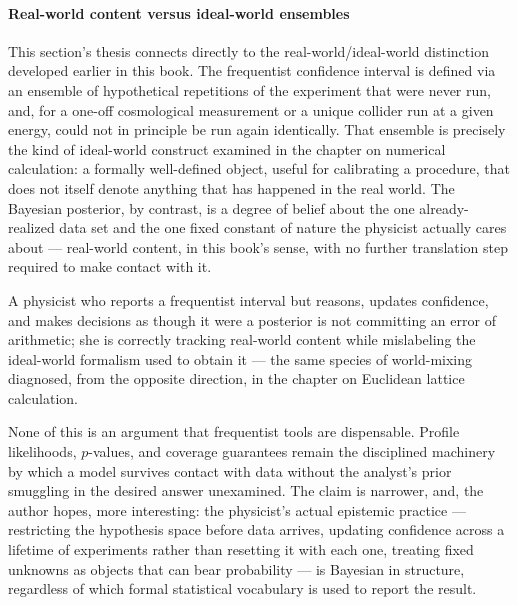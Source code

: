 \paragraph{Real-world content versus ideal-world ensembles}

This section's thesis connects directly to the real-world/ideal-world
distinction developed earlier in this book. The frequentist confidence interval
is defined via an ensemble of hypothetical repetitions of the experiment that
were never run, and, for a one-off cosmological measurement or a unique
collider run at a given energy, could not in principle be run again
identically. That ensemble is precisely the kind of ideal-world construct
examined in the chapter on numerical calculation: a formally well-defined
object, useful for calibrating a procedure, that does not itself denote
anything that has happened in the real world. The Bayesian posterior, by
contrast, is a degree of belief about the one already-realized data set and the
one fixed constant of nature the physicist actually cares about --- real-world
content, in this book's sense, with no further translation step required to
make contact with it.

\begin{corollary}
A physicist who reports a frequentist interval but reasons, updates confidence,
    and makes decisions as though it were a posterior is not committing an
    error of arithmetic; she is correctly tracking real-world content while
    mislabeling the ideal-world formalism used to obtain it --- the same
    species of world-mixing diagnosed, from the opposite direction, in the
    chapter on Euclidean lattice calculation.
\end{corollary}


None of this is an argument that frequentist tools are dispensable. Profile
likelihoods, $p$-values, and coverage guarantees remain the disciplined
machinery by which a model survives contact with data without the analyst's
prior smuggling in the desired answer unexamined. The claim is narrower, and,
the author hopes, more interesting: the physicist's actual epistemic practice
--- restricting the hypothesis space before data arrives, updating confidence
across a lifetime of experiments rather than resetting it with each one,
treating fixed unknowns as objects that can bear probability --- is Bayesian in
structure, regardless of which formal statistical vocabulary is used to report
the result.

